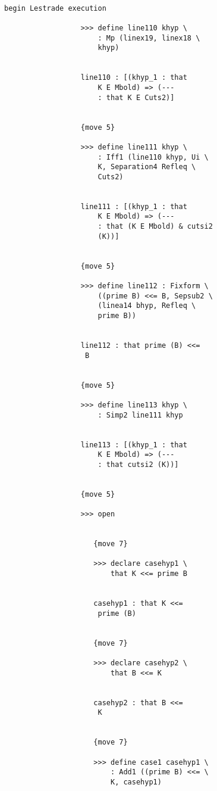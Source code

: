 \documentclass[12pt]{article}
\begin{document}
\begin{verbatim}

begin Lestrade execution

                  >>> define line110 khyp \
                      : Mp (linex19, linex18 \
                      khyp)


                  line110 : [(khyp_1 : that 
                      K E Mbold) => (--- 
                      : that K E Cuts2)]


                  {move 5}

                  >>> define line111 khyp \
                      : Iff1 (line110 khyp, Ui \
                      K, Separation4 Refleq \
                      Cuts2)


                  line111 : [(khyp_1 : that 
                      K E Mbold) => (--- 
                      : that (K E Mbold) & cutsi2 
                      (K))]


                  {move 5}

                  >>> define line112 : Fixform \
                      ((prime B) <<= B, Sepsub2 \
                      (linea14 bhyp, Refleq \
                      prime B))


                  line112 : that prime (B) <<= 
                   B


                  {move 5}

                  >>> define line113 khyp \
                      : Simp2 line111 khyp


                  line113 : [(khyp_1 : that 
                      K E Mbold) => (--- 
                      : that cutsi2 (K))]


                  {move 5}

                  >>> open


                     {move 7}

                     >>> declare casehyp1 \
                         that K <<= prime B


                     casehyp1 : that K <<= 
                      prime (B)


                     {move 7}

                     >>> declare casehyp2 \
                         that B <<= K


                     casehyp2 : that B <<= 
                      K


                     {move 7}

                     >>> define case1 casehyp1 \
                         : Add1 ((prime B) <<= \
                         K, casehyp1)



\end{verbatim}
\end{document}
